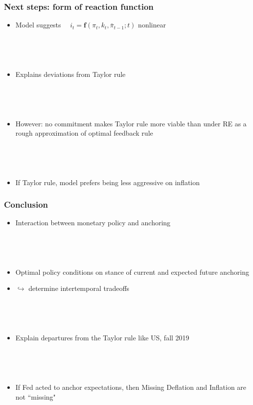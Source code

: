 \documentclass[11pt]{beamer}
\begin{document}
\begin{frame}
	\frametitle{Next steps: form of reaction function}
	
\begin{itemize}
\item Model suggests $\quad i_t = \mathbf{f}(\pi_t, k_{t}, \bar{\pi}_{t-1}; t)$ nonlinear

\

\

\item Explains deviations from Taylor rule


\

\

\item However: no commitment makes Taylor rule more viable than under RE as a rough approximation of optimal feedback rule

\

\

\item If Taylor rule, model prefers being less aggressive on inflation
\end{itemize}
	

\end{frame}

\begin{frame}
	\frametitle{Conclusion}
	
\begin{itemize}
\item Interaction between monetary policy and anchoring 

\

\

\item Optimal policy conditions on stance of current and expected future anchoring
\item[] \hspace{4cm} $\hookrightarrow$ determine intertemporal tradeoffs

\

\

\item Explain departures from the Taylor rule like US, fall 2019

\

\

\item If Fed acted to anchor expectations, then Missing Deflation and Inflation are not ``missing"
\end{itemize}


\end{frame}
\end{document}
